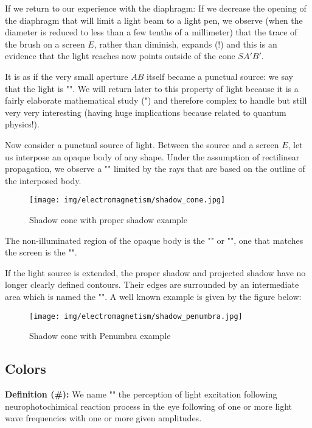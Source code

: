	If we return to our experience with the diaphragm: If we decrease the opening of the diaphragm that will limit  a light beam to a light pen, we observe (when the diameter is reduced to less than a few tenths of a millimeter) that the trace of the brush on a screen $E$, rather than diminish, expands (!) and this is an evidence that the light reaches now points outside of the cone $SA'B'$.
	
	It is as if the very small aperture $AB$ itself became a punctual source: we say that the light is "". We will return later to this property of light because it is a fairly elaborate mathematical study (") and therefore complex to handle but still very very interesting (having huge implications because related to quantum physics!).
	
	Now consider a punctual source of light. Between the source and a screen $E$, let us interpose an opaque body of any shape. Under the assumption of rectilinear propagation, we observe a "" limited by the rays that are based on the outline of the interposed body.
	\begin{figure}[H]
		\centering
		\texttt{[image: img/electromagnetism/shadow\_cone.jpg]}
		\caption{Shadow cone with proper shadow example}
	\end{figure}
	The non-illuminated region of the opaque body is the "" or "", one that matches the screen is the "".
	
	If the light source is extended, the proper shadow and projected shadow have no longer clearly defined contours. Their edges are surrounded by an intermediate area which is named the "". A well known example is given by the figure below:
	\begin{figure}[H]
		\centering
		\texttt{[image: img/electromagnetism/shadow\_penumbra.jpg]}
		\caption{Shadow cone with Penumbra example}
	\end{figure}
	
	\subsection{Colors}
	\textbf{Definition (\#\mydef):} We name "" the perception of light excitation following neurophotochimical reaction process in the eye following of one or more light wave frequencies with one or more given amplitudes.
	
